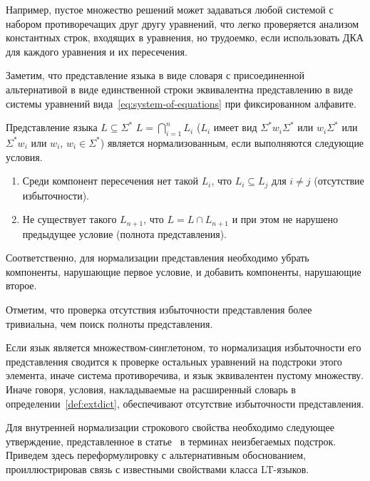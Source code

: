 \documentclass[fontsize=14pt]{scrartcl}
\begin{document}
    Например, пустое множество решений может задаваться любой системой с набором противоречащих друг другу уравнений,
    что легко проверяется анализом константных строк, входящих в уравнения, но трудоемко, если использовать ДКА для каждого уравнения и их пересечения.

    Заметим, что представление языка в виде словаря с присоединенной альтернативой в виде единственной строки эквивалентна представлению
    в виде системы уравнений вида~\ref{eq:system-of-equations} при фиксированном алфавите.
    
\begin{Definition}
Представление языка $L \subseteq \Sigma^*$ $L = \bigcap_{i=1}^n L_i$ ($L_i$ имеет вид $ \Sigma^* w_i \Sigma^*$ или $w_i \Sigma^*$ или $\Sigma^* w_i$ или $w_i$, $w_i \in \Sigma^*$)
является нормализованным, если выполняются следующие условия.
\begin{enumerate}
\item Среди компонент пересечения нет такой $L_i$, что $L_i \subseteq L_j$ для $i \neq j$ (отсутствие избыточности). 
\item Не существует такого $L_{n+1}$, что $L = L \cap L_{n+1}$ и при этом не нарушено предыдущее условие (полнота представления).
\end{enumerate}

Соответственно, для нормализации представления необходимо убрать компоненты, нарушающие первое условие, и добавить компоненты,
нарушающие второе.
\end{Definition}

Отметим, что проверка отсутствия избыточности представления более тривиальна, чем поиск полноты представления.

Если язык является множеством-синглетоном, то нормализация избыточности его представления сводится к проверке остальных уравнений на 
подстроки этого элемента, иначе система противоречива, и язык эквивалентен пустому множеству. Иначе говоря, условия, накладываемые 
на расширенный словарь в определении~\ref{def:extdict}, обеспечивают отсутствие избыточности представления.

Для внутренней нормализации строкового свойства необходимо следующее утверждение, представленное в статье~\cite{NepeivodoaAfanasyev2025} в терминах неизбегаемых подстрок.
Приведем здесь переформулировку с альтернативным обоснованием, проиллюстрировав связь с известными свойствами класса LT-языков.
\end{document}
